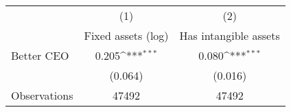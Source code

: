 {
\def\sym#1{\ifmmode^{#1}\else\(^{#1}\)\fi}
\begin{tabular}{l*{2}{c}}
\hline\hline
                    &\multicolumn{1}{c}{(1)}&\multicolumn{1}{c}{(2)}\\
                    &\multicolumn{1}{c}{Fixed assets (log)}&\multicolumn{1}{c}{Has intangible assets}\\
\hline
Better CEO          &       0.205\sym{***}&       0.080\sym{***}\\
                    &     (0.064)         &     (0.016)         \\
\hline
Observations        &       47492         &       47492         \\
\hline\hline
\end{tabular}
}
